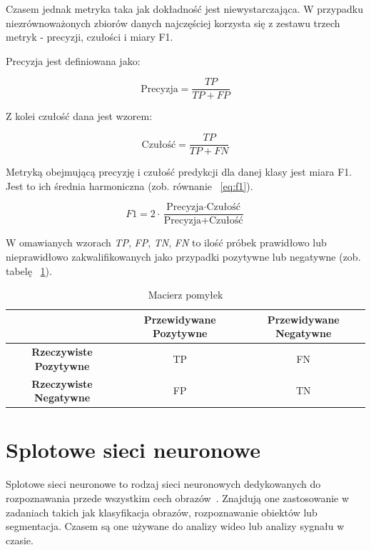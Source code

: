 Czasem jednak metryka taka jak dokładność jest niewystarczająca.
W przypadku niezrównoważonych zbiorów danych najczęściej korzysta się z zestawu trzech metryk - precyzji, czułości i miary F1.

Precyzja jest definiowana jako:

\begin{equation}
    \text{Precyzja} = \frac{TP}{TP + FP}\label{eq:precision}
\end{equation}

Z kolei czułość dana jest wzorem:

\begin{equation}
    \text{Czułość} = \frac{TP}{TP + FN}\label{eq:recall}
\end{equation}

Metryką obejmującą precyzję i czułość predykcji dla danej klasy jest miara F1.
Jest to ich średnia harmoniczna (zob.
równanie ~\ref{eq:f1}).

\begin{equation}
    F1 = 2 \cdot \frac{\text{Precyzja} \cdot \text{Czułość}}{\text{Precyzja} + \text{Czułość}}\label{eq:f1}
\end{equation}

W omawianych wzorach \textit{TP}, \textit{FP}, \textit{TN}, \textit{FN} to ilość próbek prawidłowo lub nieprawidłowo zakwalifikowanych jako przypadki pozytywne lub negatywne (zob. tabelę ~\ref{tab:cases}).

\begin{table}[h]
    \centering
    \begin{tabular}{|c|c|c|}
        \hline
        & \textbf{Przewidywane Pozytywne} & \textbf{Przewidywane Negatywne} \\ \hline
        \textbf{Rzeczywiste Pozytywne} & TP                              & FN                              \\ \hline
        \textbf{Rzeczywiste Negatywne} & FP                              & TN                              \\ \hline
    \end{tabular}
    \caption{Macierz pomyłek}\label{tab:cases}
\end{table}


\section{Splotowe sieci neuronowe}

Splotowe sieci neuronowe to rodzaj sieci neuronowych dedykowanych do rozpoznawania przede wszystkim cech obrazów~\cite{geron}.
Znajdują one zastosowanie w zadaniach takich jak klasyfikacja obrazów, rozpoznawanie obiektów lub segmentacja.
Czasem są one używane do analizy wideo lub analizy sygnału w czasie.

